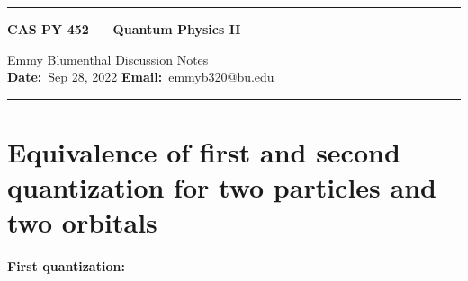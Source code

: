 \documentclass[10pt]{article}
\newcommand{\1}{\mathbf 1}
\begin{document}
\begin{center}
	\hrule
	\vspace{.4cm}
	{\textbf { \large CAS PY 452 --- Quantum Physics II}}
\end{center}
Emmy Blumenthal \hspace{\fill} \hspace{\fill}  \textbf{} Discussion Notes\  \\
\textbf{Date:}\  Sep 28, 2022   \hspace{\fill} \textbf{Email:}\ emmyb320@bu.edu \ 
\vspace{.4cm}
\hrule


\section*{Equivalence of first and second quantization for two particles and two orbitals}
\paragraph{First quantization:}
\end{document}
